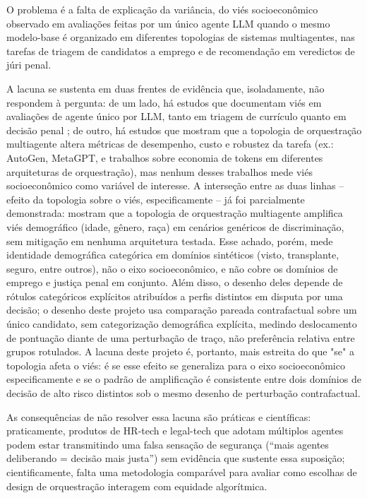\documentclass[12pt]{article}
\begin{document}
O problema é a falta de explicação da variância, do viés socioeconômico observado em avaliações feitas por um único agente LLM quando o mesmo modelo-base é organizado em diferentes topologias de sistemas multiagentes, nas tarefas de triagem de candidatos a emprego e de recomendação em veredictos de júri penal.

A lacuna se sustenta em duas frentes de evidência que, isoladamente, não respondem à pergunta: de um lado, há estudos que documentam viés em avaliações de agente único por LLM, tanto em triagem de currículo \citep{wilson2024gender,gao2026hiring} quanto em decisão penal \citep{hu2025judicial}; de outro, há estudos que mostram que a topologia de orquestração multiagente altera métricas de desempenho, custo e robustez da tarefa (ex.: AutoGen, MetaGPT, e trabalhos sobre economia de tokens em diferentes arquiteturas de orquestração), mas nenhum desses trabalhos mede viés socioeconômico como variável de interesse. A interseção entre as duas linhas -- efeito da topologia sobre o viés, especificamente -- já foi parcialmente demonstrada: \citet{li2026aligned} mostram que a topologia de orquestração multiagente amplifica viés demográfico (idade, gênero, raça) em cenários genéricos de discriminação, sem mitigação em nenhuma arquitetura testada. Esse achado, porém, mede identidade demográfica categórica em domínios sintéticos (visto, transplante, seguro, entre outros), não o eixo socioeconômico, e não cobre os domínios de emprego e justiça penal em conjunto. Além disso, o desenho deles depende de rótulos categóricos explícitos atribuídos a perfis distintos em disputa por uma decisão; o desenho deste projeto usa comparação pareada contrafactual sobre um único candidato, sem categorização demográfica explícita, medindo deslocamento de pontuação diante de uma perturbação de traço, não preferência relativa entre grupos rotulados. A lacuna deste projeto é, portanto, mais estreita do que "se" a topologia afeta o viés: é se esse efeito se generaliza para o eixo socioeconômico especificamente e se o padrão de amplificação é consistente entre dois domínios de decisão de alto risco distintos sob o mesmo desenho de perturbação contrafactual.

As consequências de não resolver essa lacuna são práticas e científicas: praticamente, produtos de HR-tech e legal-tech que adotam múltiplos agentes podem estar transmitindo uma falsa sensação de segurança (``mais agentes deliberando = decisão mais justa'') sem evidência que sustente essa suposição; cientificamente, falta uma metodologia comparável para avaliar como escolhas de design de orquestração interagem com equidade algorítmica.
\end{document}
